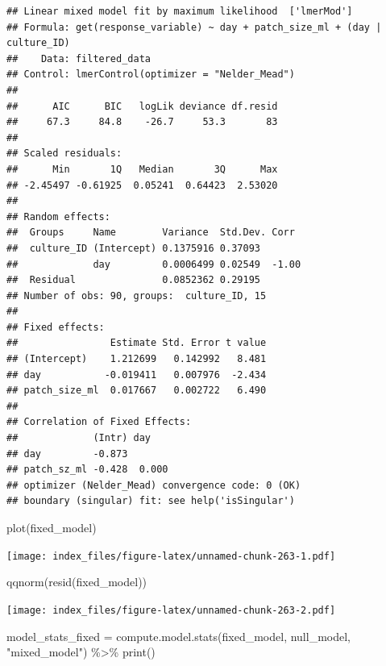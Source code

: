 \documentclass[
]{article}
\newenvironment{Shaded}{\begin{snugshade}}{\end{snugshade}}
\newcommand{\FunctionTok}[1]{\textcolor[rgb]{0.00,0.00,0.00}{#1}}
\newcommand{\NormalTok}[1]{#1}
\newcommand{\OtherTok}[1]{\textcolor[rgb]{0.56,0.35,0.01}{#1}}
\newcommand{\SpecialCharTok}[1]{\textcolor[rgb]{0.00,0.00,0.00}{#1}}
\newcommand{\StringTok}[1]{\textcolor[rgb]{0.31,0.60,0.02}{#1}}
\begin{document}
\begin{verbatim}
## Linear mixed model fit by maximum likelihood  ['lmerMod']
## Formula: get(response_variable) ~ day + patch_size_ml + (day | culture_ID)
##    Data: filtered_data
## Control: lmerControl(optimizer = "Nelder_Mead")
## 
##      AIC      BIC   logLik deviance df.resid 
##     67.3     84.8    -26.7     53.3       83 
## 
## Scaled residuals: 
##      Min       1Q   Median       3Q      Max 
## -2.45497 -0.61925  0.05241  0.64423  2.53020 
## 
## Random effects:
##  Groups     Name        Variance  Std.Dev. Corr 
##  culture_ID (Intercept) 0.1375916 0.37093       
##             day         0.0006499 0.02549  -1.00
##  Residual               0.0852362 0.29195       
## Number of obs: 90, groups:  culture_ID, 15
## 
## Fixed effects:
##                Estimate Std. Error t value
## (Intercept)    1.212699   0.142992   8.481
## day           -0.019411   0.007976  -2.434
## patch_size_ml  0.017667   0.002722   6.490
## 
## Correlation of Fixed Effects:
##             (Intr) day   
## day         -0.873       
## patch_sz_ml -0.428  0.000
## optimizer (Nelder_Mead) convergence code: 0 (OK)
## boundary (singular) fit: see help('isSingular')
\end{verbatim}

\begin{Shaded}
\begin{Highlighting}[]
\FunctionTok{plot}\NormalTok{(fixed\_model)}
\end{Highlighting}
\end{Shaded}

\texttt{[image: index\_files/figure-latex/unnamed-chunk-263-1.pdf]}

\begin{Shaded}
\begin{Highlighting}[]
\FunctionTok{qqnorm}\NormalTok{(}\FunctionTok{resid}\NormalTok{(fixed\_model))}
\end{Highlighting}
\end{Shaded}

\texttt{[image: index\_files/figure-latex/unnamed-chunk-263-2.pdf]}

\begin{Shaded}
\begin{Highlighting}[]
\NormalTok{model\_stats\_fixed }\OtherTok{=} \FunctionTok{compute.model.stats}\NormalTok{(fixed\_model,}
\NormalTok{                                        null\_model,}
                                        \StringTok{"mixed\_model"}\NormalTok{) }\SpecialCharTok{\%\textgreater{}\%}
  \FunctionTok{print}\NormalTok{()}
\end{Highlighting}
\end{Shaded}
\end{document}
